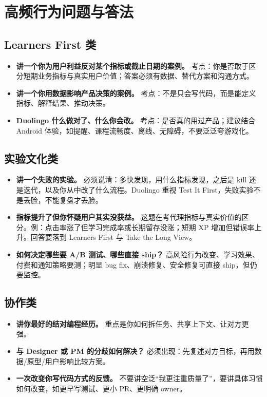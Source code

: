 \section{高频行为问题与答法}

\subsection{Learners First 类}

\begin{itemize}
  \item \textbf{讲一个你为用户利益反对某个指标或截止日期的案例。} 考点：你是否敢于区分短期业务指标与真实用户价值；答案必须有数据、替代方案和沟通方式。
  \item \textbf{讲一个你用数据影响产品决策的案例。} 考点：不是只会写代码，而是能定义指标、解释结果、推动决策。
  \item \textbf{Duolingo 什么做对了、什么你会改。} 考点：是否真的用过产品；建议结合 Android 体验，如提醒、课程流畅度、离线、无障碍，不要泛泛夸游戏化。
\end{itemize}

\subsection{实验文化类}

\begin{itemize}
  \item \textbf{讲一个失败的实验。} 必须说清：多快发现，用什么指标发现，之后是 kill 还是迭代，以及你从中改了什么流程。Duolingo 重视 Test It First，失败实验不是丢脸，不能复盘才丢脸。
  \item \textbf{指标提升了但你怀疑用户其实没获益。} 这题在考代理指标与真实价值的区分。例：点击率涨了但学习完成率或长期留存没涨；短期 XP 增加但错误率上升。回答要落到 Learners First 与 Take the Long View。
  \item \textbf{如何决定哪些要 A/B 测试、哪些直接 ship？} 高风险行为改变、学习效果、付费和通知策略要测；明显 bug fix、崩溃修复、安全修复可直接 ship，但仍要监控。
\end{itemize}

\subsection{协作类}

\begin{itemize}
  \item \textbf{讲你最好的结对编程经历。} 重点是你如何拆任务、共享上下文、让对方更强。
  \item \textbf{与 Designer 或 PM 的分歧如何解决？} 必须出现：先复述对方目标，再用数据/原型/用户影响比较方案。
  \item \textbf{一次改变你写代码方式的反馈。} 不要讲空泛“我更注重质量了”，要讲具体习惯如何改变，如更早写测试、更小 PR、更明确 owner。
\end{itemize}

